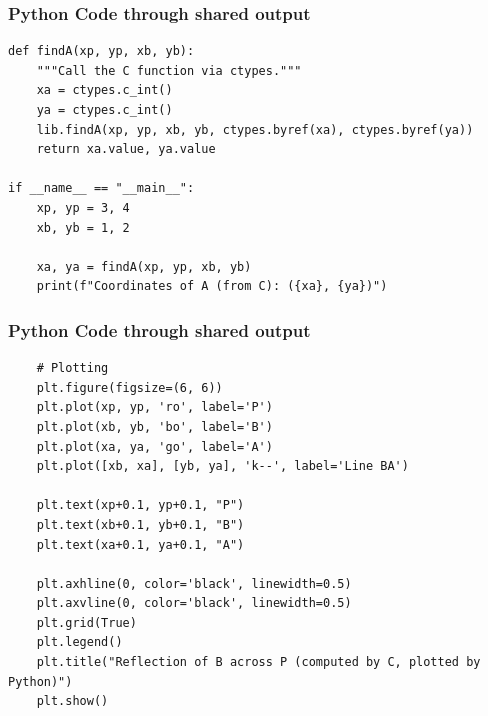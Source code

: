 \documentclass{beamer}
\begin{document}
\begin{frame}[fragile]
\frametitle{Python Code through shared output}
\begin{lstlisting}
def findA(xp, yp, xb, yb):
    """Call the C function via ctypes."""
    xa = ctypes.c_int()
    ya = ctypes.c_int()
    lib.findA(xp, yp, xb, yb, ctypes.byref(xa), ctypes.byref(ya))
    return xa.value, ya.value
    
if __name__ == "__main__":
    xp, yp = 3, 4
    xb, yb = 1, 2

    xa, ya = findA(xp, yp, xb, yb)
    print(f"Coordinates of A (from C): ({xa}, {ya})")

\end{lstlisting}
\end{frame}
\begin{frame}[fragile]
	\frametitle{Python Code through shared output}
	\begin{lstlisting}
	# Plotting
    plt.figure(figsize=(6, 6))
    plt.plot(xp, yp, 'ro', label='P')
    plt.plot(xb, yb, 'bo', label='B')
    plt.plot(xa, ya, 'go', label='A')
    plt.plot([xb, xa], [yb, ya], 'k--', label='Line BA')

    plt.text(xp+0.1, yp+0.1, "P")
    plt.text(xb+0.1, yb+0.1, "B")
    plt.text(xa+0.1, ya+0.1, "A")

    plt.axhline(0, color='black', linewidth=0.5)
    plt.axvline(0, color='black', linewidth=0.5)
    plt.grid(True)
    plt.legend()
    plt.title("Reflection of B across P (computed by C, plotted by Python)")
    plt.show()
	
	\end{lstlisting}
\end{frame}
\end{document}
